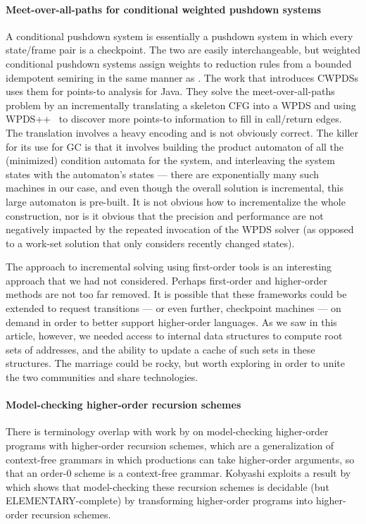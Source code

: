 \paragraph{Meet-over-all-paths for conditional weighted pushdown systems}
A conditional pushdown system is essentially a pushdown system in which every state/frame pair is a checkpoint.
The two are easily interchangeable, but weighted conditional pushdown systems assign weights to reduction rules from a bounded idempotent semiring in the same manner as \citet{mattmight:Reps:2005:Weighted-PDA}.
The work that introduces CWPDSs uses them for points-to analysis for Java.
They solve the meet-over-all-paths problem by an incrementally translating a skeleton CFG into a WPDS and using WPDS++~\citep{ianjohnson:DBLP:conf/cav/LalR06} to discover more points-to information to fill in call/return edges.
The translation involves a heavy encoding and is not obviously correct.
The killer for its use for GC is that it involves building the product automaton of all the (minimized) condition automata for the system, and interleaving the system states with the automaton's states --- there are exponentially many such machines in our case, and even though the overall solution is incremental, this large automaton is pre-built.
It is not obvious how to incrementalize the whole construction, nor is it obvious that the precision and performance are not negatively impacted by the repeated invocation of the WPDS solver (as opposed to a work-set solution that only considers recently changed states).


The approach to incremental solving using first-order tools is an interesting approach that we had not considered.
Perhaps first-order and higher-order methods are not too far removed.
It is possible that these frameworks could be extended to request transitions --- or even further, checkpoint machines --- on demand in order to better support higher-order languages.
As we saw in this article, however, we needed access to internal data structures to compute root sets of addresses, and the ability to update a cache of such sets in these structures.
The marriage could be rocky, but worth exploring in order to unite the two communities and share technologies.

\paragraph{Model-checking higher-order recursion schemes}
There is terminology overlap with work by
\citet{mattmight:Kobayashi:2009:HORS} on model-checking higher-order
programs with higher-order recursion schemes, which are a
generalization of context-free grammars in which productions can take
higher-order arguments, so that an order-0 scheme is a context-free
grammar.
Kobyashi exploits a result by \citet{dvanhorn:Ong2006ModelChecking} which
shows that model-checking these recursion schemes is decidable (but
ELEMENTARY-complete) by transforming higher-order programs into
higher-order recursion schemes.


